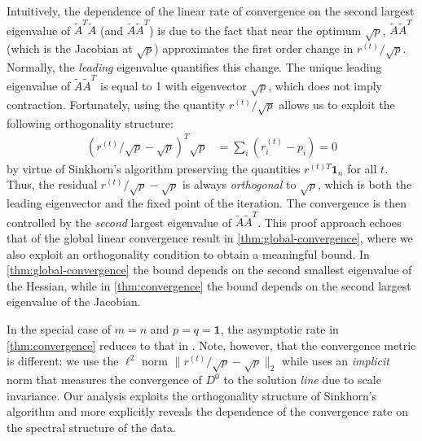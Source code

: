 Intuitively, the dependence of the linear rate of convergence on the second largest eigenvalue of $\tilde{A}^T\tilde{A}$ (and $\tilde{A}\tilde{A}^T$) is due to the fact that near the optimum $\sqrt{p}$, $\tilde{A}\tilde{A}^T$ (which is the Jacobian at $\sqrt{p}$) approximates the first order change in $r^{(t)}/\sqrt{p}$. Normally, the \emph{leading} eigenvalue quantifies this change. The unique leading eigenvalue of $\tilde{A}\tilde{A}^T$ is equal to 1 with eigenvector $\sqrt{p}$, which does not imply contraction. Fortunately, using the quantity  $r^{(t)}/\sqrt{p}$
allows us to exploit the following orthogonality structure:
\begin{align*}
(r^{(t)}/\sqrt{p}-\sqrt{p})^{T}\sqrt{p} & =\sum_{i}(r_{i}^{(t)}-p_{i})=0
\end{align*}
by virtue of Sinkhorn's algorithm preserving the quantities $r^{(t)T}\mathbf{1}_{n}$
for all $t$. Thus, the residual $r^{(t)}/\sqrt{p}-\sqrt{p}$ is always \emph{orthogonal} to
$\sqrt{p}$, which is both the leading eigenvector and the fixed point of the iteration. The convergence is then controlled by the \emph{second} largest eigenvalue of $\tilde{A}\tilde{A}^T$. This proof approach echoes that of the global linear convergence result in \cref{thm:global-convergence}, where we also exploit an orthogonality condition to obtain a meaningful bound. In \cref{thm:global-convergence} the bound depends on the second smallest eigenvalue of the Hessian, while in \cref{thm:convergence} the bound depends on the second largest eigenvalue of the Jacobian. 

In the special case of $m=n$ and $p=q=\mathbf{1}$, the asymptotic rate in \cref{thm:convergence} reduces to that in \citet{knight2008sinkhorn}. Note, however, that the convergence metric is different: we use the $\ell^2$ norm $\|r^{(t)}/\sqrt{p}-\sqrt{p}\|_2$ while \citet{knight2008sinkhorn} uses an \emph{implicit} norm that measures the convergence of $D^0$ to the solution \emph{line} due to scale invariance. Our analysis exploits the orthogonality structure of Sinkhorn's algorithm and more explicitly reveals the dependence of the convergence rate on the spectral structure of the data. 

